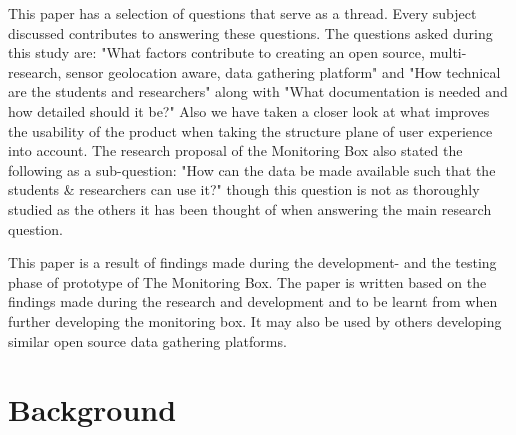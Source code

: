 \documentclass[conference]{IEEEtran}
\begin{document}
\par
This paper has a selection of questions that serve as a thread. Every subject discussed contributes to answering these questions. The questions asked during this study are: "What factors contribute to creating an open source, multi-research, sensor geolocation aware, data gathering platform"  \cite{monitoringBox2017researchproposal} and "How technical are the students and researchers" along with "What documentation is needed and how detailed should it be?" Also we have taken a closer look at what improves the usability of the product when taking the structure plane of user experience into account. \cite{monitoringBox2017researchproposal} The research proposal of the Monitoring Box also stated the following as a sub-question: "How can the data be made available such that the students \& researchers can use it?" \cite{monitoringBox2017researchproposal} though this question is not as thoroughly studied as the others it has been thought of when answering the main research question.  

\par
This paper is a result of findings made during the development-  and the testing phase of prototype of The Monitoring Box. The paper is written based on the findings made during the research and development and to be learnt from when further developing the monitoring box. It may also be used by others developing similar open source data gathering platforms.

\section{Background}
\end{document}
